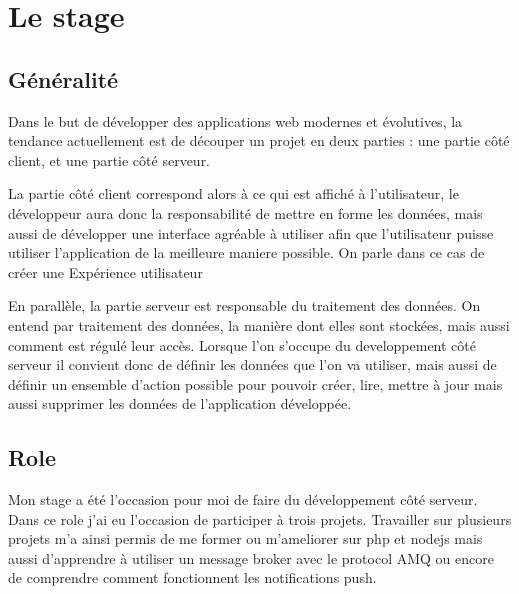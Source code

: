 \documentclass[../rapport.tex]{subfiles}
\begin{document}
    \chapter{Le stage}
    \section{Généralité}
    Dans le but de développer des applications web modernes et évolutives, 
    la tendance actuellement est de découper un projet en deux parties : une
    partie côté client, et une partie côté serveur.

    La partie côté client correspond
    alors à ce qui est affiché à l'utilisateur, le développeur aura donc la responsabilité
    de mettre en forme les données, mais aussi de développer une interface agréable à utiliser
    afin que l'utilisateur puisse utiliser l'application de la meilleure maniere possible.
    On parle dans ce cas de créer une \og Expérience utilisateur\fg~

    En parallèle, la partie serveur est responsable du traitement des données. On entend par traitement
    des données, la manière dont elles sont stockées, mais aussi comment est régulé leur accès.
    Lorsque l'on s'occupe du developpement côté serveur il convient donc de définir les données que l'on
    va utiliser, mais aussi de définir un ensemble d'action possible pour pouvoir créer, lire, mettre à jour
    mais aussi supprimer les données de l'application développée.

    \section{Role}
     Mon stage a été l'occasion pour moi de faire du développement côté serveur. Dans ce role j'ai eu l'occasion de
     participer à trois projets. Travailler sur plusieurs projets m'a ainsi permis de me former ou m'ameliorer sur php et nodejs
     mais aussi d'apprendre à utiliser un message broker avec le protocol AMQ ou encore de comprendre comment fonctionnent les notifications
     push.

    
\end{document}
